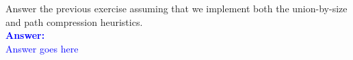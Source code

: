 \item{}
Answer the previous exercise assuming that we implement both the union-by-size
and path compression heuristics.\\[12pt]
\ifanswers
\textcolor{blue}{
\textbf{Answer:}\\[6pt]
Answer goes here
}
\newpage
\fi

